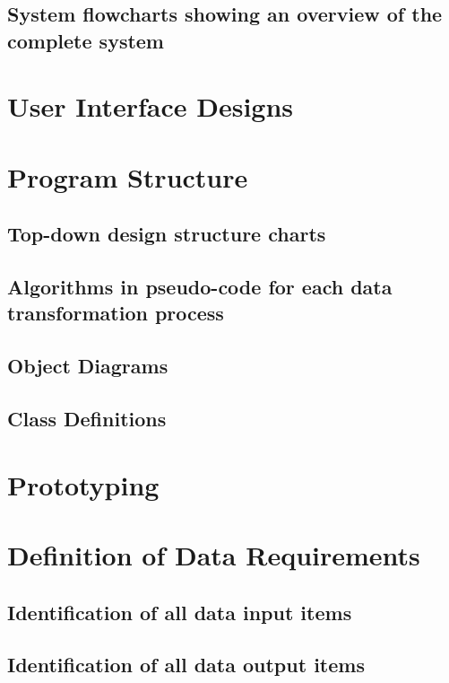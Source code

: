\subsection{System flowcharts showing an overview of the complete system}

\section{User Interface Designs}

\section{Program Structure}

\subsection{Top-down design structure charts}

\subsection{Algorithms in pseudo-code for each data transformation process}

\subsection{Object Diagrams}

\subsection{Class Definitions}

\section{Prototyping}

\section{Definition of Data Requirements}

\subsection{Identification of all data input items}

\subsection{Identification of all data output items}


